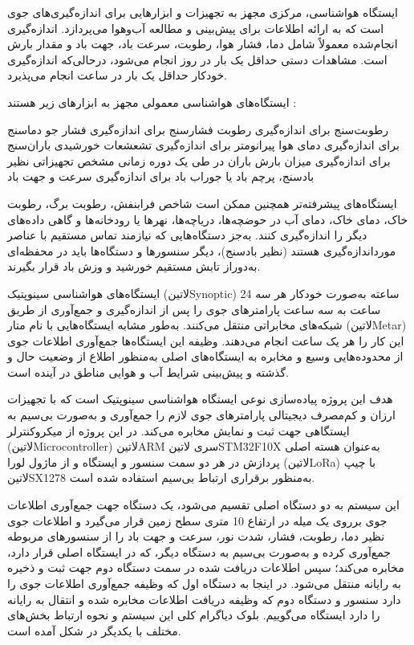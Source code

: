 ایستگاه هواشناسی، مرکزی مجهز به تجهیزات و ابزارهایی برای اندازه‌گیری‌های جوی است که به ارائه اطلاعات برای پیش‌بینی و مطالعه آب‌وهوا می‌پردازد. اندازه‌گیری انجام‌شده معمولاً شامل دما، فشار هوا، رطوبت، سرعت باد، جهت باد و مقدار بارش است. مشاهدات دستی حداقل یک بار در روز انجام می‌شود، درحالی‌که اندازه‌گیری خودکار حداقل یک بار در ساعت انجام می‌پذیرد.

ایستگاه‌های هواشناسی معمولی مجهز به ابزارهای زیر هستند :

رطوبت‌سنج برای اندازه‌گیری رطوبت
فشارسنج برای اندازه‌گیری فشار جو
دماسنج برای اندازه‌گیری دمای هوا
پیرانومتر برای اندازه‌گیری تشعشعات خورشیدی
باران‌سنج برای اندازه‌گیری میزان بارش باران در طی یک دوره زمانی مشخص
تجهیزاتی نظیر بادسنج، پرچم باد یا جوراب باد برای اندازه‌گیری سرعت و جهت باد

ایستگاه‌های پیشرفته‌تر همچنین ممکن است شاخص فرابنفش، رطوبت برگ، رطوبت خاک، دمای خاک، دمای آب در حوضچه‌ها، دریاچه‌ها، نهرها یا رودخانه‌ها و گاهی داده‌های دیگر را اندازه‌گیری کنند. به‌جز دستگاه‌هایی که نیازمند تماس مستقیم با عناصر مورداندازه‌گیری هستند (نظیر بادسنج)، دیگر سنسورها و دستگاه‌ها باید در محفظه‌ای به‌دوراز تابش مستقیم خورشید و وزش باد قرار بگیرند.

ایستگاه‌های هواشناسی سینوپتیک (‌لاتین{Synoptic}) 24 ساعته به‌صورت خودکار هر سه ساعت به سه ساعت پارامترهای جوی را پس از اندازه‌گیری و جمع‌آوری از طریق شبکه‌های مخابراتی منتقل می‌کنند. به‌طور مشابه ایستگاه‌هایی با نام متار (‌لاتین{Metar}) این کار را هر  یک ساعت انجام می‌دهند. وظیفه این ایستگاه‌ها جمع‌آوری اطلاعات جوی از محدوده‌هایی وسیع و مخابره به ایستگاه‌های اصلی به‌منظور اطلاع از وضعیت حال و گذشته و پیش‌بینی شرایط آب و هوایی مناطق در آینده است. 

هدف این پروژه پیاده‌سازی نوعی ایستگاه هواشناسی سینوپتیک است که با تجهیزات ارزان و کم‌مصرف دیجیتالی پارامترهای جوی لازم را جمع‌آوری و به‌صورت بی‌سیم به ایستگاهی جهت ثبت و نمایش مخابره می‌کند. در این پروژه از میکروکنترلر (‌لاتین{Microcontroller}) ‌لاتین{ARM} سری ‌لاتین{STM32F10X} به‌عنوان هسته اصلی پردازش در هر دو سمت سنسور و ایستگاه و از ماژول لورا (‌لاتین{LoRa}) با چیپ ‌لاتین{SX1278} به‌منظور برقراری ارتباط بی‌سیم استفاده شده ‌است.


این سیستم به دو دستگاه اصلی تقسیم می‌شود، یک دستگاه جهت جمع‌آوری اطلاعات جوی برروی یک میله در ارتفاع 10 متری سطح زمین قرار می‌گیرد و اطلاعات جوی نظیر دما، رطوبت، فشار، شدت نور، سرعت و جهت باد را از سنسورهای مربوطه جمع‌آوری کرده و به‌صورت بی‌سیم به دستگاه دیگر، که در ایستگاه اصلی قرار دارد، مخابره می‌کند؛ سپس اطلاعات دریافت شده در سمت دستگاه دوم جهت ثبت و ذخیره به رایانه منتقل می‌شود. در اینجا به دستگاه اول که وظیفه جمع‌آوری اطلاعات جوی را دارد سنسور و دستگاه دوم که وظیفه دریافت اطلاعات مخابره شده و انتقال به رایانه را دارد ایستگاه می‌گوییم. بلوک دیاگرام کلی این سیستم و نحوه ارتباط بخش‌های مختلف با یکدیگر در شکل  آمده است.

